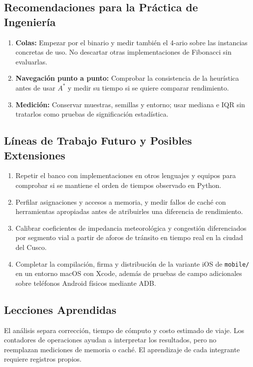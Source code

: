 \subsection*{Recomendaciones para la Práctica de Ingeniería}
\begin{enumerate}
    \item \textbf{Colas:} Empezar por el binario y medir también el 4-ario sobre las instancias concretas de uso. No descartar otras implementaciones de Fibonacci sin evaluarlas.
    \item \textbf{Navegación punto a punto:} Comprobar la consistencia de la heurística antes de usar $A^*$ y medir su tiempo si se quiere comparar rendimiento.
    \item \textbf{Medición:} Conservar muestras, semillas y entorno; usar mediana e IQR sin tratarlos como pruebas de significación estadística.
\end{enumerate}

\subsection*{Líneas de Trabajo Futuro y Posibles Extensiones}
\begin{enumerate}
    \item Repetir el banco con implementaciones en otros lenguajes y equipos para comprobar si se mantiene el orden de tiempos observado en Python.
    \item Perfilar asignaciones y accesos a memoria, y medir fallos de caché con herramientas apropiadas antes de atribuirles una diferencia de rendimiento.
    \item Calibrar coeficientes de impedancia meteorológica y congestión diferenciados por segmento vial a partir de aforos de tránsito en tiempo real en la ciudad del Cusco.
    \item Completar la compilación, firma y distribución de la variante iOS de \texttt{mobile/} en un entorno macOS con Xcode, además de pruebas de campo adicionales sobre teléfonos Android físicos mediante ADB.
\end{enumerate}

\subsection*{Lecciones Aprendidas}
El análisis separa corrección, tiempo de cómputo y costo estimado de viaje. Los contadores de operaciones ayudan a interpretar los resultados, pero no reemplazan mediciones de memoria o caché. El aprendizaje de cada integrante requiere registros propios.
